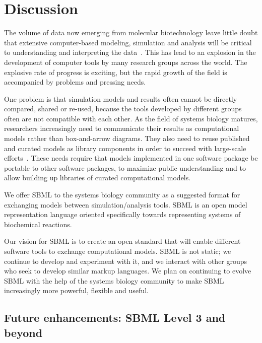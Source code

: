 
\section{Discussion}
\label{sec:discussion}

The volume of data now emerging from molecular biotechnology leave
little doubt that extensive computer-based modeling, simulation
and analysis will be critical to understanding and interpreting
the data~\citep{abbott:1999,gilman:2000,popel:1998,smaglik:2000}.
This has lead to an explosion in the development of computer tools
by many research groups across the world.  The explosive rate of
progress is exciting, but the rapid growth of the field is
accompanied by problems and pressing needs.

One problem is that simulation models and results often cannot be
directly compared, shared or re-used, because the tools developed
by different groups often are not compatible with each other.  As
the field of systems biology matures, researchers increasingly
need to communicate their results as computational models rather
than box-and-arrow diagrams.  They also need to reuse published
and curated models as library components in order to succeed with
large-scale efforts~\citep[e.g., the Alliance for Cellular
Signaling;][]{gilman:2000,smaglik:2000}.  These needs require that
models implemented in one software package be portable to other
software packages, to maximize public understanding and to allow
building up libraries of curated computational models.

We offer SBML to the systems biology community as a suggested
format for exchanging models between simulation/analysis tools.
SBML is an open model representation language oriented
specifically towards representing systems of biochemical
reactions.

Our vision for SBML is to create an open standard that will enable
different software tools to exchange computational models.  SBML
is not static; we continue to develop and experiment with it, and
we interact with other groups who seek to develop similar markup
languages.  We plan on continuing to evolve SBML with the help of
the systems biology community to make SBML increasingly more
powerful, flexible and useful.


\subsection{Future enhancements: SBML Level 3 and beyond}
\label{sec:level-3}

